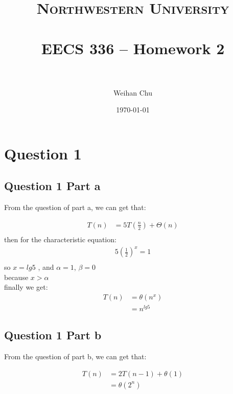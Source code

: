 \documentclass[paper=a4, fontsize=11pt]{scrartcl} %
\title{	
\normalfont \normalsize 
\textsc{Northwestern University} \\ [25pt] %
\horrule{0.5pt} \\[0.4cm] %
\huge EECS 336 -- Homework 2 \\ %
\horrule{2pt} \\[0.5cm] %
}
\author{Weihan Chu} %
\date{\normalsize\today} %
\numberwithin{equation}{section} %
\numberwithin{figure}{section} %
\numberwithin{table}{section} %
\begin{document}
\maketitle %


\section{Question 1}

\subsection{Question 1 Part a}
From the question of part a, we can get that:

\begin{equation*}
\begin{split}
T(n) &=5T(\frac{n}{2})+\Theta(n)\\
\end{split}					
\end{equation*}
then for the characteristic equation:
\begin{equation*}
\begin{split}
5({\frac{1}{2}})^x=1\\
\end{split}					
\end{equation*}
so $x=lg5$ , and $ \alpha=1 $, $\beta=0 $\\
because $x>\alpha $\\
finally we get:
\begin{equation*}
\begin{split}
T(n) &=\theta(n^x)\\
    &=n^{lg5}
\end{split}					
\end{equation*}


\subsection{Question 1 Part b}
From the question of part b, we can get that:

\begin{equation*}
\begin{split}
T(n) &=2T(n-1)+ \theta(1)\\
    &=\theta(2^n)
\end{split}					
\end{equation*}
\end{document}
